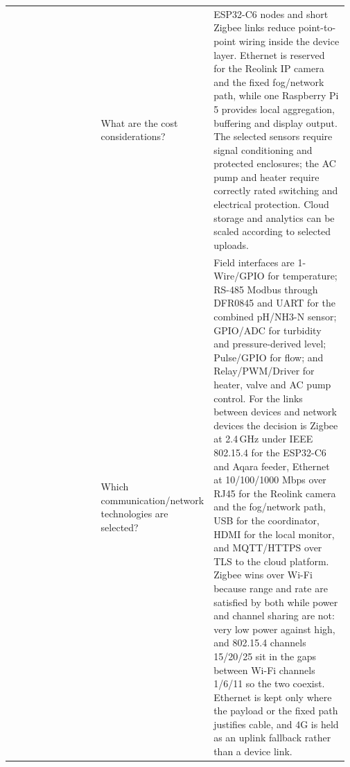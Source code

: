 \begin{longtable}{|P{0.15\linewidth}|P{0.17\linewidth}|P{0.22\linewidth}|P{0.43\linewidth}|}
 &  & What are the cost considerations? & ESP32-C6 nodes and short Zigbee links reduce point-to-point wiring inside the device layer. Ethernet is reserved for the Reolink IP camera and the fixed fog/network path, while one Raspberry Pi 5 provides local aggregation, buffering and display output. The selected sensors require signal conditioning and protected enclosures; the AC pump and heater require correctly rated switching and electrical protection. Cloud storage and analytics can be scaled according to selected uploads.\\
 &  & Which communication/network technologies are selected? & Field interfaces are 1-Wire/GPIO for temperature; RS-485 Modbus through DFR0845 and UART for the combined pH/NH3-N sensor; GPIO/ADC for turbidity and pressure-derived level; Pulse/GPIO for flow; and Relay/PWM/Driver for heater, valve and AC pump control. For the links between devices and network devices the decision is Zigbee at 2.4\,GHz under IEEE 802.15.4 for the ESP32-C6 and Aqara feeder, Ethernet at 10/100/1000 Mbps over RJ45 for the Reolink camera and the fog/network path, USB for the coordinator, HDMI for the local monitor, and MQTT/HTTPS over TLS to the cloud platform. Zigbee wins over Wi-Fi because range and rate are satisfied by both while power and channel sharing are not: very low power against high, and 802.15.4 channels 15/20/25 sit in the gaps between Wi-Fi channels 1/6/11 so the two coexist. Ethernet is kept only where the payload or the fixed path justifies cable, and 4G is held as an uplink fallback rather than a device link.\\
\end{longtable}
